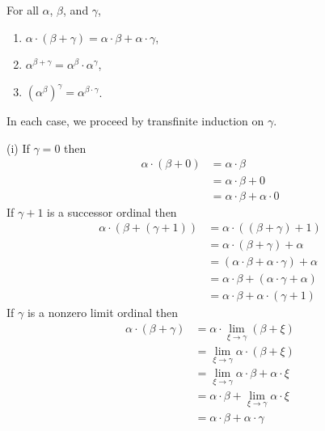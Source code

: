  For all $\alpha$, $\beta$, and $\gamma$,
\begin{enumerate}[label=(\roman*)]
\item
$\alpha \cdot \left ( \beta + \gamma \right ) = \alpha \cdot \beta + \alpha 
  \cdot \gamma$,
\item 
$\alpha^{\beta + \gamma} = \alpha^{\beta} \cdot \alpha^{\gamma}$,
\item
$\left ( \alpha^{\beta} \right )^{\gamma} = \alpha^{\beta \cdot \gamma}$.
\end{enumerate}
\begin{solution}
In each case, we proceed by transfinite induction on $\gamma$.

(i) If $\gamma = 0$ then
\begin{align*}
\alpha \cdot \left ( \beta + 0 \right ) &= \alpha \cdot \beta \\
&= \alpha \cdot \beta + 0 \\
&= \alpha \cdot \beta + \alpha \cdot 0
\end{align*}
If $\gamma + 1$ is a successor ordinal then
\begin{align*}
\alpha \cdot \left ( \beta + \left ( \gamma + 1 \right )\right ) &= \alpha 
  \cdot \left ( \left ( \beta + \gamma \right ) + 1 \right ) \\
&= \alpha \cdot \left ( \beta + \gamma \right ) + \alpha \\
&= \left ( \alpha \cdot \beta + \alpha \cdot \gamma \right ) + \alpha \\
&= \alpha \cdot \beta + \left ( \alpha \cdot \gamma + \alpha \right ) \\
&= \alpha \cdot \beta + \alpha \cdot \left ( \gamma + 1 \right )
\end{align*}
If $\gamma$ is a nonzero limit ordinal then
\begin{align*}
\alpha \cdot \left ( \beta + \gamma \right ) &= \alpha \cdot \lim_{\xi 
  \rightarrow \gamma} \left ( \beta + \xi \right ) \\
&= \lim_{\xi \rightarrow \gamma} \alpha \cdot \left ( \beta + \xi \right ) \\
&= \lim_{\xi \rightarrow \gamma} \alpha \cdot \beta + \alpha \cdot \xi \\
&= \alpha \cdot \beta + \lim_{\xi \rightarrow \gamma} \alpha \cdot \xi \\
&= \alpha \cdot \beta + \alpha \cdot \gamma
\end{align*}


\end{solution}
